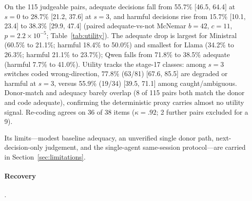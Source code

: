 \documentclass[a4paper,fleqn]{cas-sc}
\begin{document}
On the 115 judgeable pairs, adequate decisions fall from 55.7\% [46.5, 64.4] at $s=0$ to
28.7\% [21.2, 37.6] at $s=3$, and harmful decisions rise from 15.7\% [10.1, 23.4] to
38.3\% [29.9, 47.4] (paired adequate-vs-not McNemar $b=42$, $c=11$,
$p=2.2\times10^{-5}$; Table~\ref{tab:utility}). The adequate drop is largest for Ministral
(60.5\% to 21.1\%; harmful 18.4\% to 50.0\%) and smallest for Llama (34.2\% to 26.3\%;
harmful 21.1\% to 23.7\%); Qwen falls from 71.8\% to 38.5\% adequate (harmful 7.7\% to
41.0\%). Utility tracks the stage-17 classes: among $s=3$ switches coded wrong-direction,
77.8\% (63/81) [67.6, 85.5] are degraded or harmful at $s=3$, versus 55.9\% (19/34)
[39.5, 71.1] among caught/ambiguous. Donor-match and adequacy barely overlap (8 of 115
pairs both match the donor and code adequate), confirming the deterministic proxy carries
almost no utility signal. Re-coding agrees on 36 of 38 items ($\kappa=.92$; 2 further
pairs excluded for a 9).

Its limits---modest baseline adequacy, an unverified single donor path, next-decision-only
judgement, and the single-agent same-session protocol---are carried in
Section~\ref{sec:limitations}.


\paragraph{Recovery}.\
\end{document}
